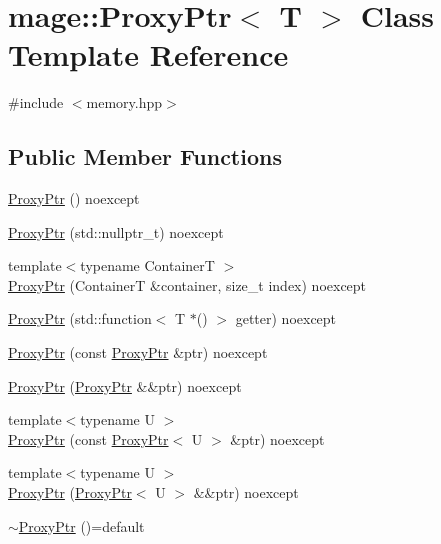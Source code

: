 \hypertarget{classmage_1_1_proxy_ptr}{}\section{mage\+:\+:Proxy\+Ptr$<$ T $>$ Class Template Reference}
\label{classmage_1_1_proxy_ptr}


{\ttfamily \#include $<$memory.\+hpp$>$}

\subsection*{Public Member Functions}
\begin{DoxyCompactItemize}
\item 
\hyperlink{classmage_1_1_proxy_ptr_a6fadf61cdc71e1d6bc9ac666eda5d2c6}{Proxy\+Ptr} () noexcept
\item 
\hyperlink{classmage_1_1_proxy_ptr_aaad9140d67d5c0a8694e94973234676a}{Proxy\+Ptr} (std\+::nullptr\+\_\+t) noexcept
\item 
{\footnotesize template$<$typename ContainerT $>$ }\\\hyperlink{classmage_1_1_proxy_ptr_a52d2afaf6a037026a4694a074f21a54f}{Proxy\+Ptr} (ContainerT \&container, size\+\_\+t index) noexcept
\item 
\hyperlink{classmage_1_1_proxy_ptr_a964d48ac831c8c179edca90bdfcc5b0b}{Proxy\+Ptr} (std\+::function$<$ T $\ast$() $>$ getter) noexcept
\item 
\hyperlink{classmage_1_1_proxy_ptr_aa31b385e10ba8ab7ce91791078e9ed6d}{Proxy\+Ptr} (const \hyperlink{classmage_1_1_proxy_ptr}{Proxy\+Ptr} \&ptr) noexcept
\item 
\hyperlink{classmage_1_1_proxy_ptr_a51e4a025cd9ca419a2c4b687b4c430bb}{Proxy\+Ptr} (\hyperlink{classmage_1_1_proxy_ptr}{Proxy\+Ptr} \&\&ptr) noexcept
\item 
{\footnotesize template$<$typename U $>$ }\\\hyperlink{classmage_1_1_proxy_ptr_a8d31b3e0e83c73067ad513e9d8fdbc4e}{Proxy\+Ptr} (const \hyperlink{classmage_1_1_proxy_ptr}{Proxy\+Ptr}$<$ U $>$ \&ptr) noexcept
\item 
{\footnotesize template$<$typename U $>$ }\\\hyperlink{classmage_1_1_proxy_ptr_a656e54f6c8f7b7407a66c03c7f6e918f}{Proxy\+Ptr} (\hyperlink{classmage_1_1_proxy_ptr}{Proxy\+Ptr}$<$ U $>$ \&\&ptr) noexcept
\item 
\hyperlink{classmage_1_1_proxy_ptr_a7f8989f9214bbc1cd94295c796cfbb9a}{$\sim$\+Proxy\+Ptr} ()=default

\end{DoxyCompactItemize}
